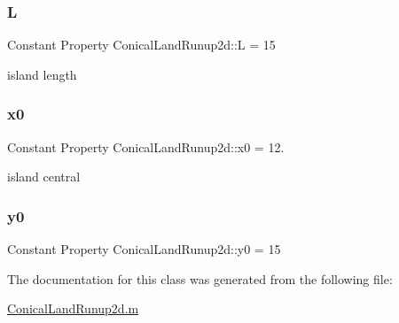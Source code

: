 \subsubsection{\texorpdfstring{L}{L}}
{\footnotesize\ttfamily Constant Property Conical\+Land\+Runup2d\+::L = 15}



island length 

\mbox{\label{class_conical_land_runup2d_ab13de10f73eb8fbabb397b213ab670a9}} 
\subsubsection{\texorpdfstring{x0}{x0}}
{\footnotesize\ttfamily Constant Property Conical\+Land\+Runup2d\+::x0 = 12.}



island central 

\mbox{\label{class_conical_land_runup2d_a88241a003707236fdb83136ed0d61d1d}} 
\subsubsection{\texorpdfstring{y0}{y0}}
{\footnotesize\ttfamily Constant Property Conical\+Land\+Runup2d\+::y0 = 15}



The documentation for this class was generated from the following file\+:\begin{DoxyCompactItemize}
\item 
\hyperlink{_conical_land_runup2d_8m}{Conical\+Land\+Runup2d.\+m}\end{DoxyCompactItemize}
